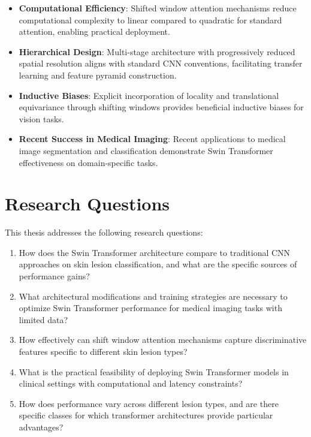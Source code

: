 \begin{itemize}
    \item \textbf{Computational Efficiency}: Shifted window attention mechanisms reduce computational complexity to linear compared to quadratic for standard attention, enabling practical deployment.
    
    \item \textbf{Hierarchical Design}: Multi-stage architecture with progressively reduced spatial resolution aligns with standard CNN conventions, facilitating transfer learning and feature pyramid construction.
    
    \item \textbf{Inductive Biases}: Explicit incorporation of locality and translational equivariance through shifting windows provides beneficial inductive biases for vision tasks.
    
    \item \textbf{Recent Success in Medical Imaging}: Recent applications to medical image segmentation and classification demonstrate Swin Transformer effectiveness on domain-specific tasks.
\end{itemize}

\section{Research Questions}

This thesis addresses the following research questions:

\begin{enumerate}
    \item How does the Swin Transformer architecture compare to traditional CNN approaches on skin lesion classification, and what are the specific sources of performance gains?
    
    \item What architectural modifications and training strategies are necessary to optimize Swin Transformer performance for medical imaging tasks with limited data?
    
    \item How effectively can shift window attention mechanisms capture discriminative features specific to different skin lesion types?
    
    \item What is the practical feasibility of deploying Swin Transformer models in clinical settings with computational and latency constraints?
    
    \item How does performance vary across different lesion types, and are there specific classes for which transformer architectures provide particular advantages?
\end{enumerate}

